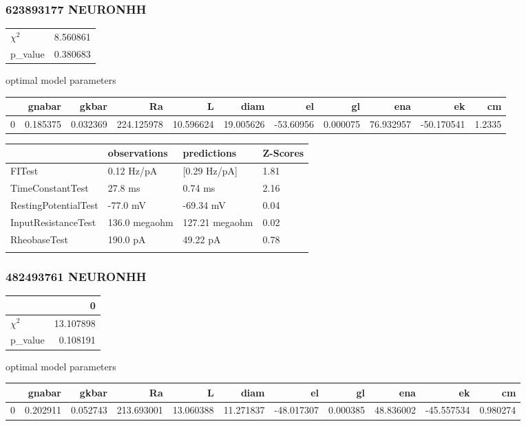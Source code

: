 \subsubsection{623893177 NEURONHH}\begin{tabular}{lr}
\toprule
$\chi^{2}$ &  8.560861 \\
p\_value    &  0.380683 \\
\bottomrule
\end{tabular}
optimal model parameters\begin{tabular}{lrrrrrrrrrr}
\toprule
{} &    gnabar &     gkbar &          Ra &          L &       diam &        el &        gl &        ena &         ek &      cm \\
\midrule
0 &  0.185375 &  0.032369 &  224.125978 &  10.596624 &  19.005626 & -53.60956 &  0.000075 &  76.932957 & -50.170541 &  1.2335 \\
\bottomrule
\end{tabular}
\begin{tabular}{llll}
\toprule
{} &   observations &     predictions & Z-Scores \\
\midrule
FITest               &     0.12 Hz/pA &    [0.29 Hz/pA] &     1.81 \\
TimeConstantTest     &        27.8 ms &         0.74 ms &     2.16 \\
RestingPotentialTest &       -77.0 mV &       -69.34 mV &     0.04 \\
InputResistanceTest  &  136.0 megaohm &  127.21 megaohm &     0.02 \\
RheobaseTest         &       190.0 pA &        49.22 pA &     0.78 \\
\bottomrule
\label{tab:conductance_623893177}

\end{tabular}

\subsubsection{482493761 NEURONHH}\begin{tabular}{lr}
\toprule
{} &          0 \\
\midrule
$\chi^{2}$ &  13.107898 \\
p\_value    &   0.108191 \\
\bottomrule
\end{tabular}
optimal model parameters\begin{tabular}{lrrrrrrrrrr}
\toprule
{} &    gnabar &     gkbar &          Ra &          L &       diam &         el &        gl &        ena &         ek &        cm \\
\midrule
0 &  0.202911 &  0.052743 &  213.693001 &  13.060388 &  11.271837 & -48.017307 &  0.000385 &  48.836002 & -45.557534 &  0.980274 \\
\bottomrule
\end{tabular}


